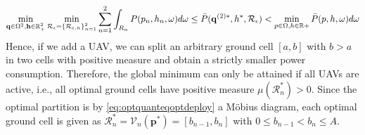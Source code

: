 \documentclass[12pt,onecolumn,final,letterpaper]{IEEEtran}
\newif\ifarxiv\arxivfalse
\renewcommand{\vq}{\mathbf p}
\renewcommand{\vp}{\mathbf q}
\newcommand{\Pbar}{\ensuremath{\bar{P}}}         %
\newcommand{\Vor}{\ensuremath{\mathcal{V}}}         %
\newcommand{\Rset}{\ensuremath{\mathcal R}}
\begin{document}
  \begin{align}
    \min_{ \vp\in\Ome^2, \vh\in\R_+^2} \min_{\Rset_{\eps}=\{\Rset_{\eps,n}\}_{n=1}^2}
    \sum_{n=1}^2 \int_{R_n} P(p_n,h_n,\ome)d\ome \leq
    \Pbar(\vp^{(2)*},h^*,\Rset_{\eps}) < \min_{p\in\Ome,h\in\R+} \Pbar(p,h,\ome)d\ome\notag
  \end{align}
  Hence, if we add a UAV, we can split an arbitrary ground cell $[a,b]$ with $b>a$ in two cells with positive measure
  and obtain a strictly smaller power consumption. Therefore, the global minimum can only be attained if all UAVs are
  active, i.e., all optimal ground cells have positive measure $\mu(\Rset^*_n)>0$. Since the optimal partition is by
  \eqref{eq:optquanteqoptdeploy} a Möbius diagram, each optimal ground cell is given as
  $\Rset^*_n=\Vor_n(\vq^*)=[b_{n-1},b_n]$ with $0 \leq b_{n-1}<b_n\leq A$. 
  \fi
\fi %
%
\ifarxiv
\end{document}
